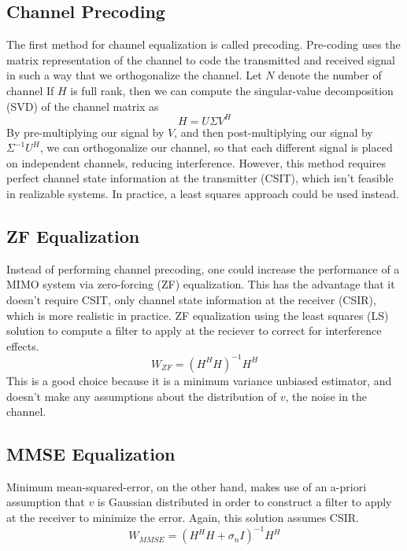 \documentclass[conference]{IEEEtran}
\begin{document}
\subsection{Channel Precoding}
The first method for channel equalization is called precoding. Pre-coding uses the matrix representation of the channel to code the transmitted and received signal in such a way that we orthogonalize the channel. 
Let $N$ denote the number of channel
If $H$ is full rank, then we can compute the singular-value decomposition (SVD) of the channel matrix as 
\begin{equation}
H = U\Sigma V^H
\end{equation}
By pre-multiplying our signal by $V$, and then post-multiplying our signal by $\Sigma^{-1} U^H$, we can orthogonalize our channel, so that each different signal is placed on independent channels, reducing interference.
 However, this method requires perfect channel state information at the transmitter (CSIT), which isn't feasible in realizable systems. In practice, a least squares approach could be used instead. 

\subsection{ZF Equalization}
Instead of performing channel precoding, one could increase the performance of a MIMO system via zero-forcing (ZF) equalization. This has the advantage that it doesn't require CSIT, only channel state information at the receiver (CSIR), which is more realistic in practice. ZF equalization using the least squares (LS) solution to compute a filter to apply at the reciever to correct for interference effects. 
\begin{equation}
W_{ZF} = (H^HH)^{-1}H^H 
\end{equation}
This is a good choice because it is a minimum variance unbiased estimator, and doesn't make any assumptions about the distribution of $v$, the noise in the channel.
\subsection{MMSE Equalization}
Minimum mean-squared-error, on the other hand, makes use of an a-priori assumption that $v$ is Gaussian distributed in order to construct a filter to apply at the receiver to minimize the error. Again, this solution assumes CSIR.
\begin{equation}
W_{MMSE} = (H^HH + \sigma_n I)^{-1}H^H 
\end{equation}
\end{document}
